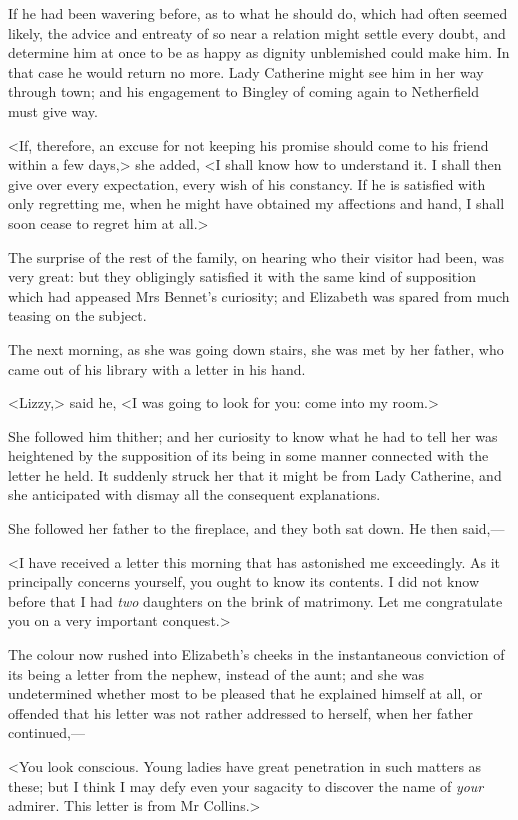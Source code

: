 If he had been wavering before, as to what he should do, which had often seemed likely, the advice and entreaty of so near a relation might settle every doubt, and determine him at once to be as happy as dignity unblemished could make him. In that case he would return no more. Lady Catherine might see him in her way through town; and his engagement to Bingley of coming again to Netherfield must give way.

<If, therefore, an excuse for not keeping his promise should come to his friend within a few days,> she added, <I shall know how to understand it. I shall then give over every expectation, every wish of his constancy. If he is satisfied with only regretting me, when he might have obtained my affections and hand, I shall soon cease to regret him at all.>

The surprise of the rest of the family, on hearing who their visitor had been, was very great: but they obligingly satisfied it with the same kind of supposition which had appeased Mrs Bennet's curiosity; and Elizabeth was spared from much teasing on the subject.

The next morning, as she was going down stairs, she was met by her father, who came out of his library with a letter in his hand.

<Lizzy,> said he, <I was going to look for you: come into my room.>

She followed him thither; and her curiosity to know what he had to tell her was heightened by the supposition of its being in some manner connected with the letter he held. It suddenly struck her that it might be from Lady Catherine, and she anticipated with dismay all the consequent explanations.

She followed her father to the fireplace, and they both sat down. He then said,—

<I have received a letter this morning that has astonished me exceedingly. As it principally concerns yourself, you ought to know its contents. I did not know before that I had \textit{two} daughters on the brink of matrimony. Let me congratulate you on a very important conquest.>

The colour now rushed into Elizabeth's cheeks in the instantaneous conviction of its being a letter from the nephew, instead of the aunt; and she was undetermined whether most to be pleased that he explained himself at all, or offended that his letter was not rather addressed to herself, when her father continued,—

<You look conscious. Young ladies have great penetration in such matters as these; but I think I may defy even your sagacity to discover the name of \textit{your} admirer. This letter is from Mr Collins.>

